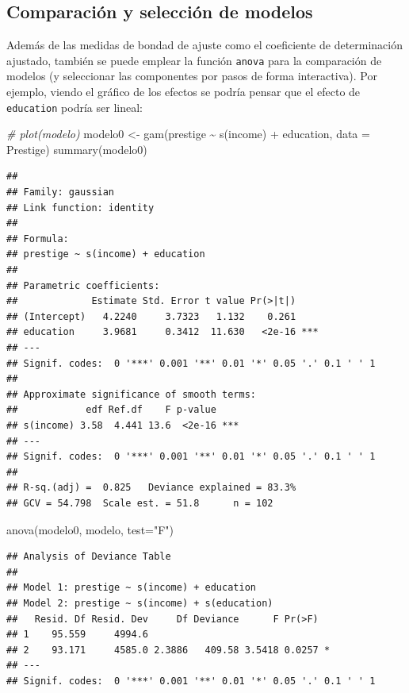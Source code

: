 \documentclass[
]{book}
\newenvironment{Shaded}{\begin{snugshade}}{\end{snugshade}}
\newcommand{\AttributeTok}[1]{\textcolor[rgb]{0.77,0.63,0.00}{#1}}
\newcommand{\CommentTok}[1]{\textcolor[rgb]{0.56,0.35,0.01}{\textit{#1}}}
\newcommand{\FunctionTok}[1]{\textcolor[rgb]{0.00,0.00,0.00}{#1}}
\newcommand{\NormalTok}[1]{#1}
\newcommand{\OtherTok}[1]{\textcolor[rgb]{0.56,0.35,0.01}{#1}}
\newcommand{\SpecialCharTok}[1]{\textcolor[rgb]{0.00,0.00,0.00}{#1}}
\newcommand{\StringTok}[1]{\textcolor[rgb]{0.31,0.60,0.02}{#1}}
\theoremstyle{break}
\theoremstyle{definition}
\theoremstyle{definition}
\theoremstyle{definition}
\theoremstyle{definition}
\theoremstyle{remark}
\begin{document}
\hypertarget{comparaciuxf3n-y-selecciuxf3n-de-modelos}{%
\subsection{Comparación y selección de modelos}\label{comparaciuxf3n-y-selecciuxf3n-de-modelos}}

Además de las medidas de bondad de ajuste como el coeficiente de determinación ajustado, también se puede emplear la función \texttt{anova} para la comparación de modelos (y seleccionar las componentes por pasos de forma interactiva).
Por ejemplo, viendo el gráfico de los efectos se podría pensar que el efecto de \texttt{education} podría ser lineal:

\begin{Shaded}
\begin{Highlighting}[]
\CommentTok{\# plot(modelo)}
\NormalTok{modelo0 }\OtherTok{\textless{}{-}} \FunctionTok{gam}\NormalTok{(prestige }\SpecialCharTok{\textasciitilde{}} \FunctionTok{s}\NormalTok{(income) }\SpecialCharTok{+}\NormalTok{ education, }\AttributeTok{data =}\NormalTok{ Prestige)}
\FunctionTok{summary}\NormalTok{(modelo0)}
\end{Highlighting}
\end{Shaded}

\begin{verbatim}
## 
## Family: gaussian 
## Link function: identity 
## 
## Formula:
## prestige ~ s(income) + education
## 
## Parametric coefficients:
##             Estimate Std. Error t value Pr(>|t|)    
## (Intercept)   4.2240     3.7323   1.132    0.261    
## education     3.9681     0.3412  11.630   <2e-16 ***
## ---
## Signif. codes:  0 '***' 0.001 '**' 0.01 '*' 0.05 '.' 0.1 ' ' 1
## 
## Approximate significance of smooth terms:
##            edf Ref.df    F p-value    
## s(income) 3.58  4.441 13.6  <2e-16 ***
## ---
## Signif. codes:  0 '***' 0.001 '**' 0.01 '*' 0.05 '.' 0.1 ' ' 1
## 
## R-sq.(adj) =  0.825   Deviance explained = 83.3%
## GCV = 54.798  Scale est. = 51.8      n = 102
\end{verbatim}

\begin{Shaded}
\begin{Highlighting}[]
\FunctionTok{anova}\NormalTok{(modelo0, modelo, }\AttributeTok{test=}\StringTok{"F"}\NormalTok{)}
\end{Highlighting}
\end{Shaded}

\begin{verbatim}
## Analysis of Deviance Table
## 
## Model 1: prestige ~ s(income) + education
## Model 2: prestige ~ s(income) + s(education)
##   Resid. Df Resid. Dev     Df Deviance      F Pr(>F)  
## 1    95.559     4994.6                                
## 2    93.171     4585.0 2.3886   409.58 3.5418 0.0257 *
## ---
## Signif. codes:  0 '***' 0.001 '**' 0.01 '*' 0.05 '.' 0.1 ' ' 1
\end{verbatim}
\end{document}
